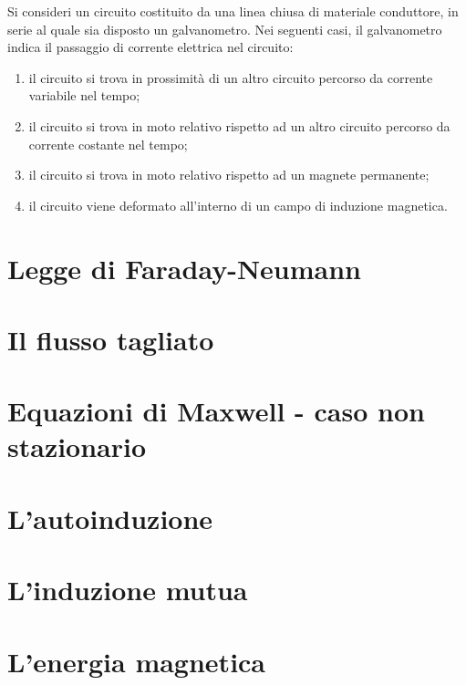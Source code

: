\begin{obses}
  Si consideri un circuito costituito da una linea chiusa di materiale conduttore, in serie al quale sia disposto un galvanometro. Nei seguenti casi, il galvanometro indica il passaggio di corrente elettrica nel circuito:
  \begin{enumerate}
    \item il circuito si trova in prossimità di un altro circuito percorso da corrente variabile nel tempo;
    \item il circuito si trova in moto relativo rispetto ad un altro circuito percorso da corrente costante nel tempo;
    \item il circuito si trova in moto relativo rispetto ad un magnete permanente;
    \item il circuito viene deformato all'interno di un campo di induzione magnetica.
  \end{enumerate}
\end{obses}

\section{Legge di Faraday-Neumann}


\section{Il flusso tagliato}


\section{Equazioni di Maxwell -  caso non stazionario}


\section{L'autoinduzione}


\section{L'induzione mutua}


\section{L'energia magnetica}

